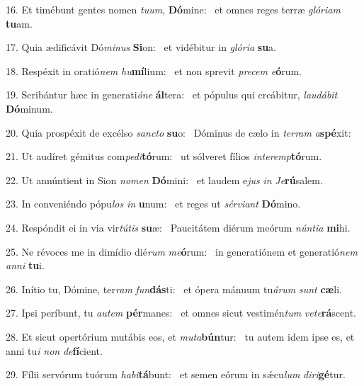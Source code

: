 16. Et timébunt gentes nomen \textit{tu}\textit{um}, \textbf{Dó}mine: \ast\  et omnes reges terræ \textit{gló}\textit{ri}\textit{am} \textbf{tu}am.\

17. Quia ædificávit Dó\textit{mi}\textit{nus} \textbf{Si}on: \ast\  et vidébitur in \textit{gló}\textit{ri}\textit{a} \textbf{su}a.\

18. Respéxit in oratió\textit{nem} \textit{hu}\textbf{mí}lium: \ast\  et non sprevit \textit{pre}\textit{cem} \textit{e}\textbf{ó}rum.\

19. Scribántur hæc in generati\textit{ó}\textit{ne} \textbf{ál}tera: \ast\  et pópulus qui creábitur, \textit{lau}\textit{dá}\textit{bit} \textbf{Dó}minum.\

20. Quia prospéxit de excélso \textit{sanc}\textit{to} \textbf{su}o: \ast\  Dóminus de cælo in \textit{ter}\textit{ram} \textit{a}\textbf{spé}xit:\

21. Ut audíret gémitus com\textit{pe}\textit{di}\textbf{tó}rum: \ast\  ut sólveret fílios \textit{in}\textit{ter}\textit{emp}\textbf{tó}rum.\

22. Ut annúntient in Sion \textit{no}\textit{men} \textbf{Dó}mini: \ast\  et laudem e\textit{jus} \textit{in} \textit{Je}\textbf{rú}salem.\

23. In conveniéndo pópu\textit{los} \textit{in} \textbf{u}num: \ast\  et reges ut \textit{sér}\textit{vi}\textit{ant} \textbf{Dó}mino.\

24. Respóndit ei in via vir\textit{tú}\textit{tis} \textbf{su}æ: \ast\  Paucitátem diérum meórum \textit{nún}\textit{ti}\textit{a} \textbf{mi}hi.\

25. Ne révoces me in dimídio dié\textit{rum} \textit{me}\textbf{ó}rum: \ast\  in generatiónem et generatió\textit{nem} \textit{an}\textit{ni} \textbf{tu}i.\

26. Inítio tu, Dómine, ter\textit{ram} \textit{fun}\textbf{dás}ti: \ast\  et ópera mánuum tu\textit{á}\textit{rum} \textit{sunt} \textbf{cæ}li.\

27. Ipsi períbunt, tu \textit{au}\textit{tem} \textbf{pér}manes: \ast\  et omnes sicut vestimén\textit{tum} \textit{ve}\textit{te}\textbf{rá}scent.\

28. Et sicut opertórium mutábis eos, et \textit{mu}\textit{ta}\textbf{bún}tur: \ast\  tu autem idem ipse es, et anni tu\textit{i} \textit{non} \textit{de}\textbf{fí}cient.\

29. Fílii servórum tuórum \textit{ha}\textit{bi}\textbf{tá}bunt: \ast\  et semen eórum in sǽcu\textit{lum} \textit{di}\textit{ri}\textbf{gé}tur.\

